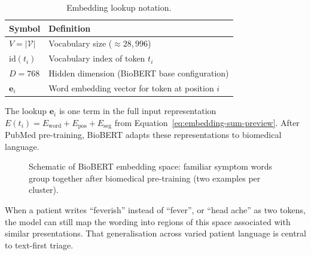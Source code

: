 \begin{table}[H]
\centering
\small
\begin{tabular}{|l|p{10cm}|}
\hline
\textbf{Symbol} & \textbf{Definition} \\
\hline
\(V = \lvert\mathcal{V}\rvert\) & Vocabulary size (\(\approx 28{,}996\)) \\
\(\mathrm{id}(t_i)\) & Vocabulary index of token \(t_i\) \\
\(D=768\) & Hidden dimension (BioBERT base configuration) \\
\(\mathbf{e}_i\) & Word embedding vector for token at position \(i\) \\
\hline
\end{tabular}
\caption{Embedding lookup notation.}
\label{tab:embed-symbols}
\end{table}

The lookup \(\mathbf{e}_i\) is one term in the full input representation \(E(t_i) = E_{\mathrm{word}} + E_{\mathrm{pos}} + E_{\mathrm{seg}}\) from Equation~\eqref{eq:embedding-sum-preview}. After PubMed pre-training, BioBERT adapts these representations to biomedical language.

\begin{figure}[H]
\centering
{}
\caption{Schematic of BioBERT embedding space: familiar symptom words group together after biomedical pre-training (two examples per cluster).}
\label{fig:word-embed}
\end{figure}

When a patient writes ``feverish'' instead of ``fever'', or ``head ache'' as two tokens, the model can still map the wording into regions of this space associated with similar presentations. That generalisation across varied patient language is central to text-first triage.

